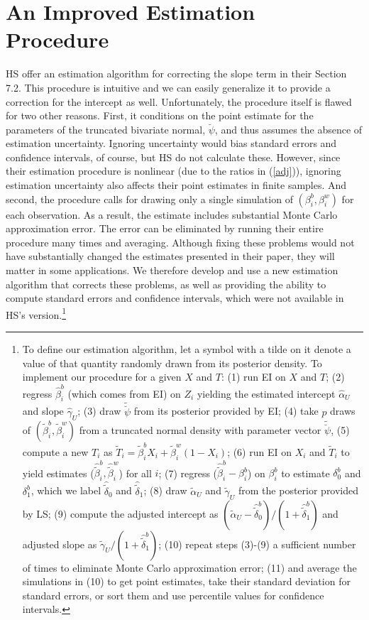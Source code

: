 \documentclass[11pt,titlepage]{article}
\newcommand{\psiu}{\breve{\psi}}
\begin{document}
\section{An Improved Estimation Procedure}

HS offer an estimation algorithm for correcting the slope term in
their Section 7.2.  This procedure is intuitive and we can easily
generalize it to provide a correction for the intercept as well.
Unfortunately, the procedure itself is flawed for two other reasons.
First, it conditions on the point estimate for the parameters of the
truncated bivariate normal, $\breve\psi$, and thus assumes the absence
of estimation uncertainty.  Ignoring uncertainty would bias standard
errors and confidence intervals, of course, but HS do not calculate
these.  However, since their estimation procedure is nonlinear (due to
the ratios in (\ref{adj})), ignoring estimation uncertainty also
affects their point estimates in finite samples.  And second, the
procedure calls for drawing only a single simulation of
$(\beta_i^b,\beta_i^w)$ for each observation.  As a result, the
estimate includes substantial Monte Carlo approximation error.  The
error can be eliminated by running their entire procedure many times
and averaging.  Although fixing these problems would not have
substantially changed the estimates presented in their paper, they
will matter in some applications.  We therefore develop and use a new
estimation algorithm that corrects these problems, as well as
providing the ability to compute standard errors and confidence
intervals, which were not available in HS's version.\footnote{To
  define our estimation algorithm, let a symbol with a tilde on it
  denote a value of that quantity randomly drawn from its posterior
  density.  To implement our procedure for a given $X$ and $T$: (1)
  run EI on $X$ and $T$; (2) regress $\hat\beta_i^b$ (which comes from
  EI) on $Z_i$ yielding the estimated intercept $\hat\alpha_U$ and
  slope $\hat\gamma_U$; (3) draw $\tilde\psiu$ from its posterior
  provided by EI; (4) take $p$ draws of
  $(\tilde\beta_i^b,\tilde\beta_i^w)$ from a truncated normal density
  with parameter vector $\tilde\psiu$, (5) compute a new $T_i$ as
  $\tilde T_i=\tilde\beta_i^bX_i+\tilde\beta_i^w(1-X_i)$; (6) run EI
  on $X_i$ and $\tilde T_i$ to yield estimates
  ($\hat\tilde\beta_i^b,\hat\tilde\beta_i^w$) for all $i$; (7) regress
  ($\hat\tilde\beta_i^b-\beta_i^b$) on $\beta_i^b$ to estimate
  $\delta_0^b$ and $\delta_1^b$, which we label $\hat\tilde\delta_0$
  and $\hat\tilde\delta_1$; (8) draw $\tilde\alpha_U$ and
  $\tilde\gamma_U$ from the posterior provided by LS; (9) compute the
  adjusted intercept as
  $(\tilde\alpha_U-\hat\tilde\delta_0^b)/(1+\hat\tilde\delta_1^b)$ and
  adjusted slope as $\tilde\gamma_U/(1+\hat\tilde\delta_1^b)$; (10)
  repeat steps (3)-(9) a sufficient number of times to eliminate Monte
  Carlo approximation error; (11) and average the simulations in (10)
  to get point estimates, take their standard deviation for standard
  errors, or sort them and use percentile values for confidence
  intervals.}
\end{document}
